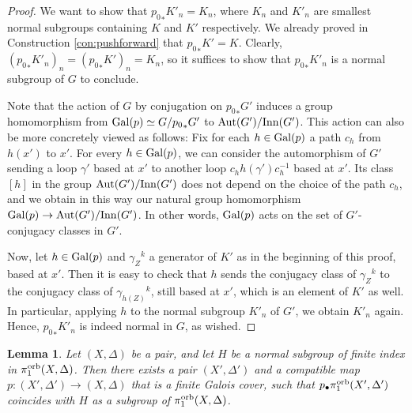 \documentclass{amsart}
\newtheorem{lemma}[theorem]{Lemma}
\theoremstyle{definition}
\theoremstyle{remark}
\numberwithin{equation}{section}
\begin{document}
\begin{proof}
We want to show that
${p_0}_*K'_n = K_n$, where $K_n$ and $K'_n$ are smallest normal subgroups containing $K$ and $K'$ respectively. We already proved in Construction \ref{con:pushforward} that ${p_0}_*K'=K$.
Clearly, $({p_0}_*K'_n)_n = ({p_0}_*K')_n = K_n$, so it suffices to show that ${p_0}_*K'_n$ is a normal subgroup of $G$ to conclude.

Note that the action of $G$ by conjugation on ${p_0}_*G'$ induces a group homomorphism from ${\rm Gal}(p)\simeq G/{p_0}_*G'$ to ${\rm Aut}(G')/{\rm Inn}(G')$.  This action can also be more concretely viewed as follows:
Fix for each $h\in{\rm Gal}(p)$ a path $c_h$ from $h(x')$ to $x'$. For every $h\in{\rm Gal}(p)$, we can consider the automorphism of $G'$ sending a loop $\gamma'$ based at $x'$ to another loop $c_h h(\gamma') c_{h}^{-1}$ based at $x'$. Its class $[h]$ in the group ${\rm Aut}(G')/{\rm Inn}(G')$ does not depend on the choice of the path $c_h$, and we obtain in this way our natural group homomorphism ${\rm Gal}(p)\to {\rm Aut}(G')/{\rm Inn}(G')$. In other words, ${\rm Gal}(p)$ acts on the set of $G'$-conjugacy classes in $G'$.

Now, let $h\in{\rm Gal}(p)$ and ${\gamma_Z}^k$ a generator of $K'$ as in the beginning of this proof, based at $x'$. Then it is easy to check that $h$ sends the conjugacy class of ${\gamma_Z}^k$ to the conjugacy class of ${\gamma_{h(Z)}}^k$, still based at $x'$, which is an element of $K'$ as well. In particular, applying $h$ to the normal subgroup ${K'}_n$ of $G'$, we obtain $K'_n$ again. Hence, ${p_0}_*K'_n$ is indeed normal in $G$, as wished.
\end{proof}


\begin{lemma}\label{lem:galoiscorr}
    Let $(X,\Delta)$ be a pair, and let $H$ be a normal subgroup of finite index in $\pi_1^{\rm orb}(X,\Delta)$.
    Then there exists a pair $(X',\Delta')$ and a compatible map $p:(X',\Delta')\to (X,\Delta)$ that is a finite Galois cover, such that 
    $p_{\bullet}\pi_1^{\rm orb}(X',\Delta')$ coincides with $H$ as a subgroup of $\pi_1^{\rm orb}(X,\Delta)$.
\end{lemma}
\end{document}
